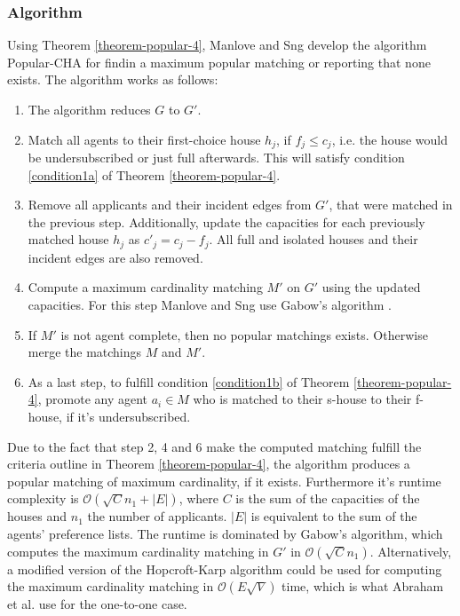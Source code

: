 \subsubsection{Algorithm}
Using Theorem \ref{theorem-popular-4}, Manlove and Sng develop the algorithm Popular-CHA for findin a maximum popular matching or reporting that none exists.\cite{ManlovePopularMatchings} The algorithm works as follows:
\begin{enumerate}
    \item The algorithm reduces $G$ to $G'$.
    \item Match all agents to their first-choice house $h_j$, if $f_j \leq c_j$, i.e. the house would be undersubscribed or just full afterwards. This will satisfy condition \ref{condition1a} of Theorem \ref{theorem-popular-4}.
    \item Remove all applicants and their incident edges from $G'$, that were matched in the previous step. Additionally, update the capacities for each previously matched house $h_j$ as $c'_j = c_j - f_j$. All full and isolated houses and their incident edges are also removed.
    \item Compute a maximum cardinality matching $M'$ on $G'$ using the updated capacities. For this step Manlove and Sng use Gabow's algorithm \cite{Gabow1983}.
    \item If $M'$ is not agent complete, then no popular matchings exists. Otherwise merge the matchings $M$ and $M'$.
    \item As a last step, to fulfill condition \ref{condition1b} of Theorem \ref{theorem-popular-4}, promote any agent $a_i \in M$ who is matched to their s-house to their f-house, if it's undersubscribed. 
\end{enumerate}

Due to the fact that step 2, 4 and 6 make the computed matching fulfill the criteria outline in Theorem \ref{theorem-popular-4}, the algorithm produces a popular matching of maximum cardinality, if it exists. Furthermore it's runtime complexity is $\mathcal{O}(\sqrt{C}n_1 + |E|)$, where $C$ is the sum of the capacities of the houses and $n_1$ the number of applicants. $|E|$ is equivalent to the sum of the agents' preference lists. The runtime is dominated by Gabow's algorithm, which computes the maximum cardinality matching in $G'$ in $\mathcal{O}(\sqrt{C}n_1)$.\cite{ManlovePopularMatchings} Alternatively, a modified version of the Hopcroft-Karp algorithm could be used for computing the maximum cardinality matching in $\mathcal{O}(E\sqrt{V})$\cite{Hopcroft} time, which is what Abraham et al. use for the one-to-one case.

